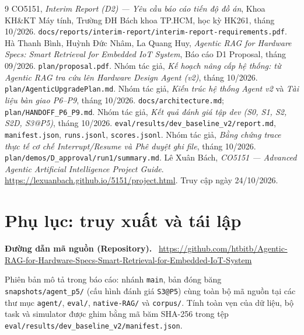 \documentclass[12pt,a4paper]{report}
\newcommand{\file}[1]{{\small\ttfamily\color{bkblue}\nolinkurl{#1}}}
\newcommand{\subhead}[1]{\par\smallskip\noindent\textbf{#1}\ }
\begin{document}
\clearpage
\renewcommand{\bibname}{Tài liệu tham khảo}
\begin{thebibliography}{9}\small
{} CO5151, \emph{Interim Report (D2) — Yêu cầu báo cáo tiến độ đồ án}, Khoa KH\&KT Máy tính, Trường ĐH Bách khoa TP.HCM, học kỳ HK261, tháng 10/2026. \file{docs/reports/interim-report/interim-report-requirements.pdf}.
 Hà Thanh Bình, Huỳnh Đức Nhâm, La Quang Huy, \emph{Agentic RAG for Hardware Specs: Smart Retrieval for Embedded IoT System}, Báo cáo D1 Proposal, tháng 09/2026. \file{plan/proposal.pdf}.
 Nhóm tác giả, \emph{Kế hoạch nâng cấp hệ thống: từ Agentic RAG tra cứu lên Hardware Design Agent (v2)}, tháng 10/2026. \file{plan/AgenticUpgradePlan.md}.
 Nhóm tác giả, \emph{Kiến trúc hệ thống Agent v2} và \emph{Tài liệu bàn giao P6–P9}, tháng 10/2026. \file{docs/architecture.md}; \file{plan/HANDOFF_P6_P9.md}.
 Nhóm tác giả, \emph{Kết quả đánh giá tập dev (S0, S1, S2, S2D, S3@P5)}, tháng 10/2026. \file{eval/results/dev_baseline_v2/report.md}, \file{manifest.json}, \file{runs.jsonl}, \file{scores.jsonl}.
 Nhóm tác giả, \emph{Bằng chứng trace thực tế cơ chế Interrupt/Resume và Phê duyệt ghi file}, tháng 10/2026. \file{plan/demos/D_approval/run1/summary.md}.
 Lê Xuân Bách, \emph{CO5151 — Advanced Agentic Artificial Intelligence Project Guide}. \url{https://lexuanbach.github.io/5151/project.html}. Truy cập ngày 24/10/2026.
\end{thebibliography}

\clearpage
\chapter*{Phụ lục: truy xuất và tái lập}
\subhead{Đường dẫn mã nguồn (Repository).}
\url{https://github.com/htbitb/Agentic-RAG-for-Hardware-Specs-Smart-Retrieval-for-Embedded-IoT-System}

Phiên bản mô tả trong báo cáo: nhánh \file{main}, bản đóng băng \file{snapshots/agent_p5/} (cấu hình đánh giá \file{S3@P5}) cùng toàn bộ mã nguồn tại các thư mục \file{agent/}, \file{eval/}, \file{native-RAG/} và \file{corpus/}. Tính toàn vẹn của dữ liệu, bộ task và simulator được ghim bằng mã băm SHA-256 trong tệp \file{eval/results/dev_baseline_v2/manifest.json}.
\end{document}

